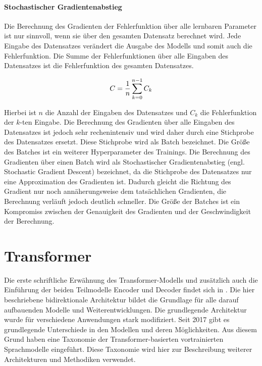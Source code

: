 \paragraph{Stochastischer Gradientenabstieg}
Die Berechnung des Gradienten der Fehlerfunktion über alle lernbaren Parameter ist nur sinnvoll, wenn sie über den gesamten Datensatz berechnet wird.
Jede Eingabe des Datensatzes verändert die Ausgabe des Modells und somit auch die Fehlerfunktion.
Die Summe der Fehlerfunktionen über alle Eingaben des Datensatzes ist die Fehlerfunktion des gesamten Datensatzes.

\begin{equation}
    C = \frac{1}{n}\sum_{k=0}^{n-1}C_k\\
\end{equation}

Hierbei ist $n$ die Anzahl der Eingaben des Datensatzes und $C_k$ die Fehlerfunktion der $k$-ten Eingabe.
Die Berechnung des Gradienten über alle Eingaben des Datensatzes ist jedoch sehr rechenintensiv und wird daher durch eine Stichprobe des Datensatzes ersetzt.
Diese Stichprobe wird als Batch bezeichnet.
Die Größe des Batches ist ein weiterer Hyperparameter des Trainings.
Die Berechnung des Gradienten über einen Batch wird als Stochastischer Gradientenabstieg (engl.
Stochastic Gradient Descent) bezeichnet, da die Stichprobe des Datensatzes nur eine Approximation des Gradienten ist.
Dadurch gleicht die Richtung des Gradient nur noch annäherungsweise dem tatsächlichen Gradienten, die Berechnung verläuft jedoch deutlich schneller.
Die Größe der Batches ist ein Kompromiss zwischen der Genauigkeit des Gradienten und der Geschwindigkeit der Berechnung.\\

\section{Transformer}\label{sec:grundlagen:transformer}
%
Die erste schriftliche Erwähnung des Transformer-Modells und zusätzlich auch die Einführung der beiden Teilmodelle Encoder und Decoder findet sich in \citet{attention}.
Die hier beschriebene bidirektionale Architektur bildet die Grundlage für alle darauf aufbauenden Modelle und Weiterentwicklungen.
Die grundlegende Architektur wurde für verschiedene Anwendungen stark modifiziert.
Seit 2017 gibt es grundlegende Unterschiede in den Modellen und deren Möglichkeiten.
Aus diesem Grund haben \citet{ammus} eine Taxonomie der Transformer-basierten vortrainierten Sprachmodelle eingeführt.
Diese Taxonomie wird hier zur Beschreibung weiterer Architekturen und Methodiken verwendet.\\

